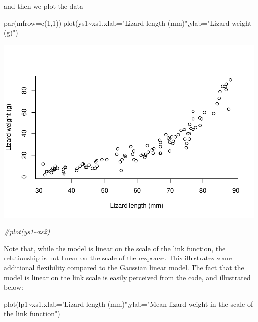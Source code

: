 \documentclass[
]{book}
\newenvironment{Shaded}{\begin{snugshade}}{\end{snugshade}}
\newcommand{\AttributeTok}[1]{\textcolor[rgb]{0.77,0.63,0.00}{#1}}
\newcommand{\CommentTok}[1]{\textcolor[rgb]{0.56,0.35,0.01}{\textit{#1}}}
\newcommand{\DecValTok}[1]{\textcolor[rgb]{0.00,0.00,0.81}{#1}}
\newcommand{\FunctionTok}[1]{\textcolor[rgb]{0.00,0.00,0.00}{#1}}
\newcommand{\NormalTok}[1]{#1}
\newcommand{\SpecialCharTok}[1]{\textcolor[rgb]{0.00,0.00,0.00}{#1}}
\newcommand{\StringTok}[1]{\textcolor[rgb]{0.31,0.60,0.02}{#1}}
\begin{document}
and then we plot the data

\begin{Shaded}
\begin{Highlighting}[]
\FunctionTok{par}\NormalTok{(}\AttributeTok{mfrow=}\FunctionTok{c}\NormalTok{(}\DecValTok{1}\NormalTok{,}\DecValTok{1}\NormalTok{))}
\FunctionTok{plot}\NormalTok{(ys1}\SpecialCharTok{\textasciitilde{}}\NormalTok{xs1,}\AttributeTok{xlab=}\StringTok{"Lizard length (mm)"}\NormalTok{,}\AttributeTok{ylab=}\StringTok{"Lizard weight (g)"}\NormalTok{)}
\end{Highlighting}
\end{Shaded}

\includegraphics{ECOMODbook_files/figure-latex/glm2-1.pdf}

\begin{Shaded}
\begin{Highlighting}[]
\CommentTok{\#plot(ys1\textasciitilde{}xs2)}
\end{Highlighting}
\end{Shaded}

Note that, while the model is linear on the scale of the link function, the relationship is not linear on the scale of the response. This illustrates some additional flexibility compared to the Gaussian linear model. The fact that the model is linear on the link scale is easily perceived from the code, and illustrated below:

\begin{Shaded}
\begin{Highlighting}[]
\FunctionTok{plot}\NormalTok{(lp1}\SpecialCharTok{\textasciitilde{}}\NormalTok{xs1,}\AttributeTok{xlab=}\StringTok{"Lizard length (mm)"}\NormalTok{,}\AttributeTok{ylab=}\StringTok{"Mean lizard weight in the scale of the link function"}\NormalTok{)}
\end{Highlighting}
\end{Shaded}
\end{document}
